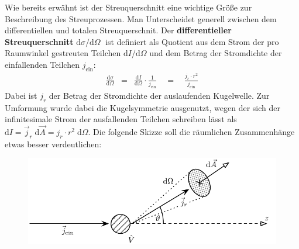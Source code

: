 Wie bereits erwähnt ist der Streuquerschnitt eine wichtige Größe zur Beschreibung des Streuprozessen. Man Unterscheidet generell zwischen dem differentiellen und totalen Streuquerschnit. Der {\bf differentieller Streuquerschnitt} $\mathrm{d}\sigma/\mathrm{d}\Omega\;$ ist definiert als Quotient aus dem Strom der  pro Raumwinkel gestreuten Teilchen $\mathrm{d}I/\mathrm{d}\Omega$ und dem Betrag der Stromdichte der einfallenden Teilchen $j_{\text{ein}}$:
\begin{eqnarray*}
	\frac{\mathrm{d}\sigma}{\mathrm{d}\Omega} &=& \frac{\mathrm{d} I}{\mathrm{d}\Omega}\cdot\frac{1}{j_{\text{ein}}} \quad\!=\!\quad \frac{j_r\cdot r^2}{j_{\text{ein}}}
\end{eqnarray*}
Dabei ist $j_r$ der Betrag der Stromdichte der auslaufenden Kugelwelle. Zur Umformung wurde dabei die Kugelsymmetrie ausgenutzt, wegen der sich der infinitesimale Strom der ausfallenden Teilchen schreiben lässt als $\mathrm{d}I=\vec{j}_r\;\mathrm{d}\vec{A} = j_r\cdot r^2\;\mathrm{d}\Omega$. Die folgende Skizze soll die räumlichen Zusammenhänge etwas besser verdeutlichen: 
\vspace{-1ex}\begin{figure}[!h]\center
	\includegraphics[scale=1]{Figs/DiffStreuQuer}
\end{figure}\vspace{-4ex} 

